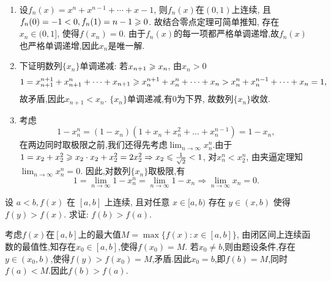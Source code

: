 \begin{solution}
    \begin{enumerate}
        \item 设$f_n(x) = x^n + x^{n-1} + \cdots + x - 1$, 则$f_n(x)$在$(0,1)$上连续, 且$f_n(0) = -1 < 0, f_n(1) = n-1 \geqslant 0$. 故结合零点定理可简单推知, 存在$x_n \in (0,1]$, 使得$f(x_n) = 0$. 由于$f_n(x)$的每一项都严格单调递增,故$f_n(x)$也严格单调递增,因此$x_n$是唯一解.
        \item 下证明数列$\{x_n\}$单调递减:
        若$x_{n+1} \geqslant x_n$, 由$x_n > 0$
        $$1 = x_{n+1}^{n+1} + x_{n+1}^n + \dots + x_{n+1} \geqslant x_n^{n+1} + x_n^n + \dots + x_n > x_n^n + x_n^{n-1} + \dots + x_n = 1,$$故矛盾,因此$x_{n+1} < x_n$. $\{x_n\}$单调递减,有$0$为下界, 故数列$\{x_n\}$收敛.
        \item 考虑$$1-x_n^n = (1-x_n)(1+x_n+x_n^2+\dots+x_n^{n-1}) = 1-x_n,$$在两边同时取极限之前,我们还得先考虑$\lim_{n \to \infty} x_n^n$.由于$1 = x_2 + x_2^2 \geqslant x_2 \cdot x_2 + x_2^2 = 2x_2^2 \Rightarrow x_2 \leqslant \frac{1}{\sqrt{2}} < 1$, 对$x_n^n < x_2^n$, 由夹逼定理知$\lim_{n \to \infty} x_n^n = 0$. 因此,对数列$\{x_n\}$取极限,有
    $$1 = \lim_{n \to \infty} 1 - x_n^n = \lim_{n \to \infty} 1 - x_n \Rightarrow \lim_{n \to \infty} x_n = 0.$$
    \end{enumerate}

    
\end{solution}

\begin{exercise}[2.C.10]
    设 $a<b, f(x)$ 在 $[a,b]$ 上连续, 且对任意 $x \in [a,b)$ 存在 $y \in (x,b)$ 使得 $f(y)>f(x)$. 求证: $f(b)>f(a)$.
\end{exercise}

\begin{solution}
    考虑$f(x)$在$[a,b]$上的最大值$M = \max \{ f(x): x \in [a,b] \}$, 由闭区间上连续函数的最值性,知存在$x_0 \in [a,b]$,使得$f(x_0) = M$. 若$x_0 \ne b$,则由题设条件,存在$y \in (x_0,b)$,使得$f(y) > f(x_0) = M$,矛盾.因此$x_0 = b$,即$f(b) = M$,同时$f(a) < M$.因此$f(b) > f(a)$.
\end{solution}

\newpage